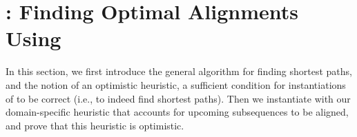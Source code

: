\section{\astarix: Finding Optimal Alignments Using \A} \label{sec:astarix-algo}
In this section, we first introduce the general \A algorithm for finding
shortest paths, and the notion of an optimistic heuristic, a sufficient
condition for instantiations of \A to be correct (i.e., to indeed find shortest
paths). Then we instantiate \A with our domain-specific heuristic that accounts
for upcoming subsequences to be aligned, and prove that this heuristic is
optimistic.


